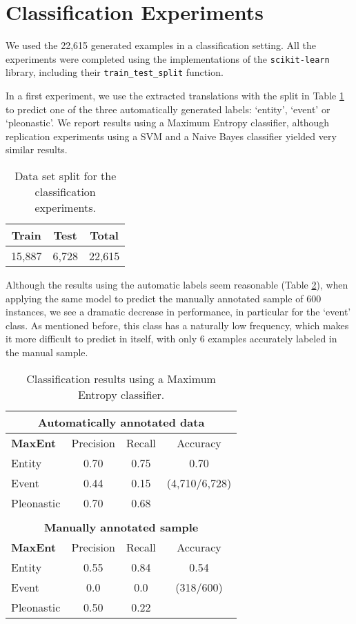 \documentclass[10pt, a4paper]{article}
\begin{document}
\section{Classification Experiments}\label{sec:experiments}

We used the 22,615 generated examples in a classification setting. All the 
experiments were completed using the implementations of the 
\texttt{scikit-learn} library, including their \texttt{train\_test\_split} 
function. 

In a first experiment, we use the extracted translations with the split in Table 
\ref{tab:split} to predict one of the three automatically generated labels: 
`entity', `event' or `pleonastic'. We report results using a Maximum Entropy 
classifier, although replication experiments using a SVM and a Naive Bayes 
classifier yielded very similar results. 


\begin{table}[h!]\centering
\begin{tabular}{ccc}
\toprule
\textbf{Train} & \textbf{Test} & \textbf{Total} \\
\midrule
15,887 & 6,728 & 22,615 \\
\bottomrule
\end{tabular}
\caption{Data set split for the classification experiments.}\label{tab:split}
\end{table}

Although the results using the automatic labels seem reasonable (Table  
\ref{tab:maxentautomatic}), when applying the same model to predict the manually 
annotated sample of 600 instances, we see a dramatic decrease in performance, in 
particular for the `event' class. As mentioned before, this class has a naturally 
low frequency, which makes it more 
difficult to predict in itself, with only 6 examples accurately labeled in the manual sample. 

\begin{center} \begin{table}[h!]\centering 
\begin{tabular}{l ccc}
\multicolumn{4}{c}{ \textbf{Automatically annotated data}}\\ 
\toprule
\textbf{MaxEnt}& Precision & Recall & Accuracy \\ 
\midrule 
Entity &0.70 & 0.75 &   0.70\\
Event & 0.44 & 0.15 & (4,710/6,728) \\
Pleonastic & 0.70 & 0.68&   \\ 
\midrule & & & \\
\multicolumn{4}{c}{\textbf{Manually annotated sample}}  \\ 
\midrule
\textbf{MaxEnt}& Precision & Recall & Accuracy \\ 
\midrule 
Entity &0.55 & 0.84 &0.54\\ 
Event &0.0 & 0.0 & (318/600)\\ 
Pleonastic & 0.50 & 0.22 & \\ 
\bottomrule
\end{tabular} \caption{Classification results using a Maximum Entropy
classifier.} \label{tab:maxentautomatic}
\end{table}
\end{center}
\end{document}
